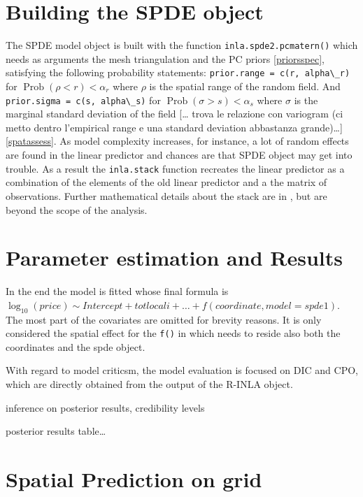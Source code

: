 \documentclass[
  12pt,
  a4paper,
  oneside]{book}
\newcommand{\passthrough}[1]{#1}
\theoremstyle{definition}
\theoremstyle{definition}
\theoremstyle{definition}
\theoremstyle{remark}
\begin{document}
\hypertarget{spdemodeol}{%
\section{Building the SPDE object}\label{spdemodeol}}

The SPDE model object is built with the function \passthrough{\lstinline!inla.spde2.pcmatern()!} which needs as arguments the mesh triangulation and the PC priors \ref{priorsspec}, satisfying the following probability statements: \passthrough{\lstinline!prior.range = c(r, alpha\_r)!} for \(\operatorname{Prob}(\rho<r)<\alpha_{r}\) where \(\rho\) is the spatial range of the random field. And \passthrough{\lstinline!prior.sigma = c(s, alpha\_s)!} for \(\operatorname{Prob}(\sigma>s)<\alpha_{s}\) where \(\sigma\) is the marginal standard deviation of the field {[}\ldots{} trova le relazione con variogram (ci metto dentro l'empirical range e una standard deviation abbastanza grande)\ldots{]} \ref{spatassess}.
As model complexity increases, for instance, a lot of random effects are found in the linear predictor and chances are that SPDE object may get into trouble. As a result the \passthrough{\lstinline!inla.stack!} function recreates the linear predictor as a combination of the elements of the old linear predictor and a the matrix of observations. Further mathematical details about the stack are in \citet{Blangiardo-Cameletti}, but are beyond the scope of the analysis.

\hypertarget{fit}{%
\section{Parameter estimation and Results}\label{fit}}

In the end the model is fitted whose final formula is \(\log_{10}(price) \sim Intercept + totlocali + \dots + f(coordinate, model = spde1)\). The most part of the covariates are omitted for brevity reasons. It is only considered the spatial effect for the \passthrough{\lstinline!f()!} in which needs to reside also both the coordinates and the spde object.

With regard to model criticsm, the model evaluation is focused on DIC and CPO, which are directly obtained from the output of the R-INLA object.

inference on posterior results, credibility levels

posterior results table\ldots{}

\hypertarget{spatial-prediction-on-grid}{%
\section{Spatial Prediction on grid}\label{spatial-prediction-on-grid}}
\end{document}
